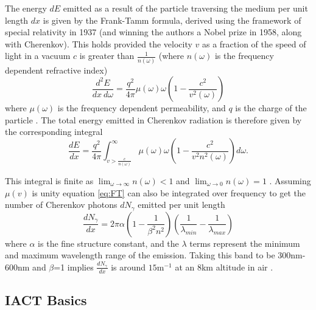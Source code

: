 The energy $dE$ emitted as a result of the particle traversing the medium per unit length $dx$ is given by the Frank-Tamm formula, derived using the framework of special relativity in 1937 (and winning the authors a Nobel prize in 1958, along with Cherenkov). This holds provided the velocity $v$ as a fraction of the speed of light in a vacuum $c$ is greater than $\frac{1}{n(\omega)}$ (where $n(\omega)$ is the frequency dependent refractive index)
\begin{equation}
    \frac{d^2E}{dx\ d\omega}=\frac{q^2}{4\pi}\mu(\omega)\omega\left(1- \frac{c^2}{v^2(\omega)} \right)
    \label{eq:FT}
\end{equation}
where $\mu(\omega)$ is the frequency dependent permeability, and $q$ is the charge of the particle \cite{franktamm}. The total energy emitted in Cherenkov radiation is therefore given by the corresponding integral
\begin{equation}
    \frac{dE}{dx}=\frac{q^2}{4\pi}\int_{v>\frac{c}{n(\omega)}}^{\infty}\mu(\omega)\omega \left(1- \frac{c^2}{v^2n^2(\omega)} \right) d \omega .
    \label{eq:FT2}
\end{equation}

This integral is finite as $\lim_{\omega \to \infty} n(\omega)<1$ and $\lim_{\omega \to 0} n(\omega)=1$ . Assuming $\mu(v)$ is unity equation \ref{eq:FT} can also be integrated over frequency \cite{katz} to get the number of Cherenkov photons $dN_{\gamma}$ emitted per unit length
\begin{equation}
    \frac{dN_{\gamma}}{dx}=2\pi\alpha \left( 1- \frac{1}{\beta^2n^2} \right) \left(\frac{1}{\lambda_{min}}-\frac{1}{\lambda_{max}} \right)
\end{equation}
where $\alpha$ is the fine structure constant, and the $\lambda$ terms represent the minimum and maximum wavelength range of the emission. Taking this band to be 300nm-600nm and $\beta$=1 implies $\frac{dN_{\gamma}}{dx}$ is around $\mathrm{15 m^{-1}}$ at an 8km altitude in air \cite{katz}. 
\subsection{IACT Basics}

